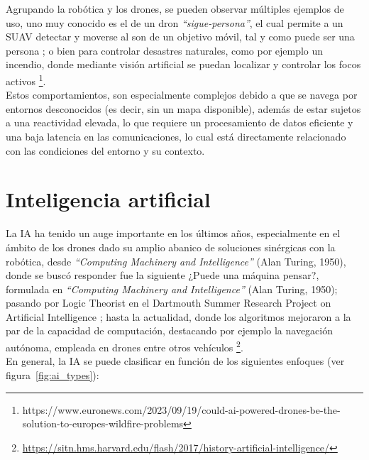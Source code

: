 Agrupando la robótica y los drones, se pueden observar múltiples ejemplos de uso, uno muy conocido es el de un dron \emph{``sigue-persona''}, el cual permite a un \ac{SUAV} detectar y moverse al son de un objetivo móvil, tal y como puede ser una persona \cite{8967675}; o bien para controlar desastres naturales, como por ejemplo un incendio, donde mediante visión artificial se puedan localizar y controlar los focos activos \footnote[13]{https://www.euronews.com/2023/09/19/could-ai-powered-drones-be-the-solution-to-europes-wildfire-problems}.\\

Estos comportamientos, son especialmente complejos debido a que se navega por entornos desconocidos (es decir, sin un mapa disponible), además de estar sujetos a una reactividad elevada, lo que requiere un procesamiento de datos eficiente y una baja latencia en las comunicaciones, lo cual está directamente relacionado con las condiciones del entorno y su contexto.

\section{Inteligencia artificial}
\label{subsec:inteligencia_artificial}

La \ac{IA} ha tenido un auge importante en los últimos años, especialmente en el ámbito de los drones dado su amplio abanico de soluciones sinérgicas con la robótica, desde \emph{``Computing Machinery and Intelligence''} (Alan Turing, 1950), donde se buscó responder fue la siguiente ¿Puede una máquina pensar?, formulada en \emph{``Computing Machinery and Intelligence''} (Alan Turing, 1950); pasando por Logic Theorist en el Dartmouth Summer Research Project on Artificial Intelligence \cite{logic-theorist}; hasta la actualidad, donde los algoritmos mejoraron a la par de la capacidad de computación, destacando por ejemplo la navegación autónoma, empleada en drones entre otros vehículos \footnote[14]{\url{https://sitn.hms.harvard.edu/flash/2017/history-artificial-intelligence/}}.\\

En general, la \ac{IA} se puede clasificar en función de los siguientes enfoques (ver figura~\ref{fig:ai_types}):

